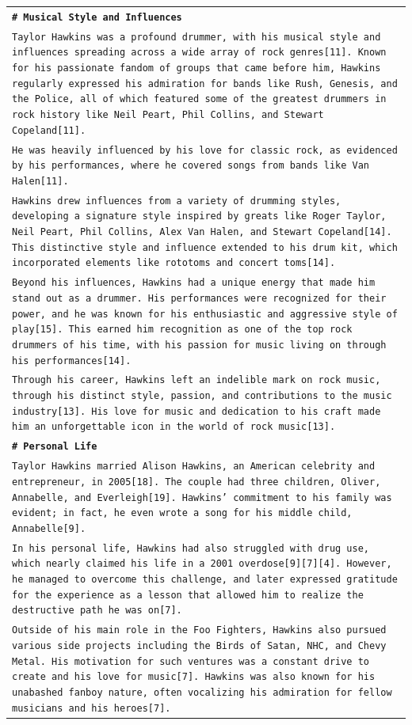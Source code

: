\documentclass[11pt]{article}
\begin{document}
\begin{longtable}{p{\textwidth}}
\vspace{1pt}
\texttt{\small{\textbf{\# Musical Style and Influences}}} \\
\texttt{\small{Taylor Hawkins was a profound drummer, with his musical style and influences spreading across a wide array of rock genres[11]. Known for his passionate fandom of groups that came before him, Hawkins regularly expressed his admiration for bands like Rush, Genesis, and the Police, all of which featured some of the greatest drummers in rock history like Neil Peart, Phil Collins, and Stewart Copeland[11].}} \\
\texttt{\small{He was heavily influenced by his love for classic rock, as evidenced by his performances, where he covered songs from bands like Van Halen[11].}} \\
\texttt{\small{Hawkins drew influences from a variety of drumming styles, developing a signature style inspired by greats like Roger Taylor, Neil Peart, Phil Collins, Alex Van Halen, and Stewart Copeland[14]. This distinctive style and influence extended to his drum kit, which incorporated elements like rototoms and concert toms[14].}} \\
\texttt{\small{Beyond his influences, Hawkins had a unique energy that made him stand out as a drummer. His performances were recognized for their power, and he was known for his enthusiastic and aggressive style of play[15]. This earned him recognition as one of the top rock drummers of his time, with his passion for music living on through his performances[14].}} \\
\texttt{\small{Through his career, Hawkins left an indelible mark on rock music, through his distinct style, passion, and contributions to the music industry[13]. His love for music and dedication to his craft made him an unforgettable icon in the world of rock music[13].}} \\

\vspace{1pt}
\texttt{\small{\textbf{\# Personal Life}}} \\
\texttt{\small{Taylor Hawkins married Alison Hawkins, an American celebrity and entrepreneur, in 2005[18]. The couple had three children, Oliver, Annabelle, and Everleigh[19]. Hawkins' commitment to his family was evident; in fact, he even wrote a song for his middle child, Annabelle[9].}} \\
\texttt{\small{In his personal life, Hawkins had also struggled with drug use, which nearly claimed his life in a 2001 overdose[9][7][4]. However, he managed to overcome this challenge, and later expressed gratitude for the experience as a lesson that allowed him to realize the destructive path he was on[7].}} \\
\texttt{\small{Outside of his main role in the Foo Fighters, Hawkins also pursued various side projects including the Birds of Satan, NHC, and Chevy Metal. His motivation for such ventures was a constant drive to create and his love for music[7]. Hawkins was also known for his unabashed fanboy nature, often vocalizing his admiration for fellow musicians and his heroes[7].}} \\


\end{longtable}
\end{document}
